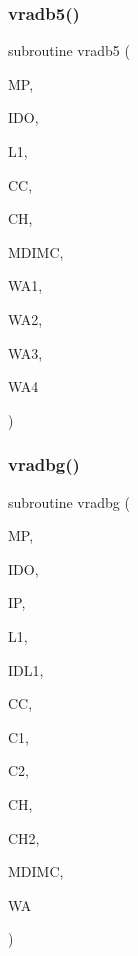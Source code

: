 \subsubsection{\texorpdfstring{vradb5()}{vradb5()}}
{\footnotesize\ttfamily subroutine vradb5 (\begin{DoxyParamCaption}\item[{}]{MP,  }\item[{}]{I\+DO,  }\item[{}]{L1,  }\item[{dimension(mdimc,ido,5,l1)}]{CC,  }\item[{dimension(mdimc,ido,l1,5)}]{CH,  }\item[{}]{M\+D\+I\+MC,  }\item[{dimension(ido)}]{W\+A1,  }\item[{dimension(ido)}]{W\+A2,  }\item[{dimension(ido)}]{W\+A3,  }\item[{dimension(ido)}]{W\+A4 }\end{DoxyParamCaption})}

\mbox{\label{sfft_8f_aacbf9c8d49a2bab31f765ae928ddd167}} 
\subsubsection{\texorpdfstring{vradbg()}{vradbg()}}
{\footnotesize\ttfamily subroutine vradbg (\begin{DoxyParamCaption}\item[{}]{MP,  }\item[{}]{I\+DO,  }\item[{}]{IP,  }\item[{}]{L1,  }\item[{}]{I\+D\+L1,  }\item[{dimension(mdimc,ido,ip,l1)}]{CC,  }\item[{dimension(mdimc,ido,l1,ip)}]{C1,  }\item[{dimension(mdimc,idl1,ip)}]{C2,  }\item[{dimension(mdimc,ido,l1,ip)}]{CH,  }\item[{dimension(mdimc,idl1,ip)}]{C\+H2,  }\item[{}]{M\+D\+I\+MC,  }\item[{dimension(ido)}]{WA }\end{DoxyParamCaption})}

\mbox{\label{sfft_8f_a69a51bb30027a4f9516a780a1c8a01be}} 
